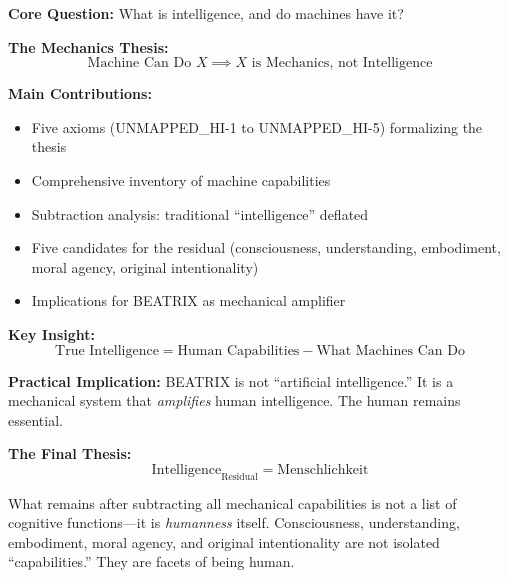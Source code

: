 \begin{tcolorbox}[colback=green!10!white, colframe=green!75!black,
    title=\textbf{Appendix UNMAPPED_HI: Summary}]

\textbf{Core Question:} What is intelligence, and do machines have it?

\textbf{The Mechanics Thesis:}
\begin{equation}
\text{Machine Can Do } X \implies X \text{ is Mechanics, not Intelligence}
\end{equation}

\textbf{Main Contributions:}
\begin{itemize}[nosep]
    \item Five axioms (UNMAPPED_HI-1 to UNMAPPED_HI-5) formalizing the thesis
    \item Comprehensive inventory of machine capabilities
    \item Subtraction analysis: traditional ``intelligence'' deflated
    \item Five candidates for the residual (consciousness, understanding, embodiment, moral agency, original intentionality)
    \item Implications for BEATRIX as mechanical amplifier
\end{itemize}

\textbf{Key Insight:}
\begin{equation}
\text{True Intelligence} = \text{Human Capabilities} - \text{What Machines Can Do}
\end{equation}

\textbf{Practical Implication:} BEATRIX is not ``artificial intelligence.'' It is a mechanical system that \textit{amplifies} human intelligence. The human remains essential.

\vspace{1em}
\textbf{The Final Thesis:}
\begin{equation}
\boxed{\text{Intelligence}_{\text{Residual}} = \text{Menschlichkeit}}
\end{equation}

What remains after subtracting all mechanical capabilities is not a list of cognitive functions---it is \textit{humanness} itself. Consciousness, understanding, embodiment, moral agency, and original intentionality are not isolated ``capabilities.'' They are facets of being human.

\end{tcolorbox}



